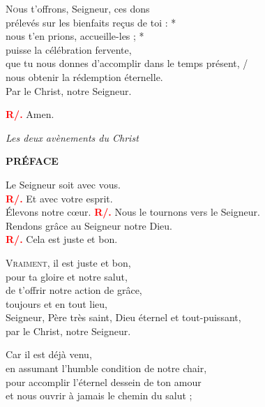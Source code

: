 \documentclass[12pt]{article}
\begin{document}
\lettrine[lines=2, lhang=0.1, loversize=0.2, findent=0pt, nindent=0pt]{\color{red}N}ous t’offrons, Seigneur, ces dons\\
prélevés sur les bienfaits reçus de toi : *\\
nous t’en prions, accueille-les ; *\\
puisse la célébration fervente,\\
\hspace*{1em}que tu nous donnes d’accomplir dans le temps présent, /\\
\hspace*{1em}nous obtenir la rédemption éternelle.\\
Par le Christ, notre Seigneur.

\vspace{0.5em}
\textbf{\textcolor{red}{R/.}} Amen.

\vspace{0.5em}
\hfill\textit{Les deux avènements du Christ}

\textbf{\textcolor{rougeliturgique}{PRÉFACE}}


Le Seigneur soit avec vous.\\
\textbf{\textcolor{red}{R/.}} Et avec votre esprit.\\
Élevons notre cœur.
\textbf{\textcolor{red}{R/.}} Nous le tournons vers le Seigneur.\\
Rendons grâce au Seigneur notre Dieu.\\
\textbf{\textcolor{red}{R/.}} Cela est juste et bon.

\vspace{1em}
\lettrine[lines=2, lhang=0.1, loversize=0.2, findent=0pt, nindent=0pt]{\color{red}V}{raiment}, il est juste et bon,\\
pour ta gloire et notre salut,\\
de t’offrir notre action de grâce,\\
toujours et en tout lieu,\\
Seigneur, Père très saint, Dieu éternel et tout-puissant,\\
par le Christ, notre Seigneur.

\vspace{0.5em}
Car il est déjà venu,\\
\hspace*{1em} en assumant l’humble condition de notre chair,\\
\hspace*{1em} pour accomplir l’éternel dessein de ton amour\\
\hspace*{1em} et nous ouvrir à jamais le chemin du salut ;
\end{document}
